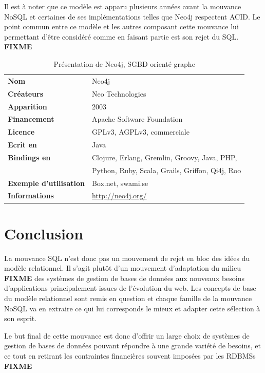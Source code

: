 \documentclass[11pt]{article}
\begin{document}
Il est à noter que ce modèle est apparu plusieurs années avant la mouvance NoSQL et certaines de ses implémentations telles que Neo4j respectent ACID. Le point commun entre ce modèle et les autres composant cette mouvance lui permettant d'être considéré comme en faisant partie est son rejet du SQL. \colorbox{BrickRed}{\textbf{FIXME}} 
\begin{table}[H]
  \centering
  \begin{tabular}{l | l}
    \textbf{Nom} & Neo4j \\
    \textbf{Créateurs} & Neo Technologies \\
    \textbf{Apparition} & 2003 \\
    \textbf{Financement} & Apache Software Foundation \\
    \textbf{Licence} & GPLv3, AGPLv3, commerciale \\
    \textbf{Ecrit en} & Java \\
    \textbf{Bindings en} & Clojure, Erlang, Gremlin, Groovy, Java, PHP,  \\
    & Python, Ruby, Scala, Grails, Griffon, Qi4j, Roo\\
    \textbf{Exemple d'utilisation} & Box.net, swami.se \\
    \textbf{Informations} & \url{http://neo4j.org/}
  \end{tabular}
  \caption{Présentation de Neo4j, SGBD orienté graphe}
\end{table}
\section{Conclusion}
La mouvance SQL n'est donc pas un mouvement de rejet en bloc des idées du modèle relationnel. Il s'agit plutôt d'un mouvement d'adaptation du milieu \colorbox{BrickRed}{\textbf{FIXME}} des systèmes de gestion de bases de données aux nouveaux besoins d'applications principalement issues de l'évolution du web. Les concepts de base du modèle relationnel sont remis en question et chaque famille de la mouvance NoSQL va en extraire ce qui lui corresponds le mieux et adapter cette sélection à son esprit.

Le but final de cette mouvance est donc d'offrir un large choix de systèmes de gestion de bases de données pouvant répondre à une grande variété de besoins, et ce tout en retirant les contraintes financières souvent imposées par les RDBMSs \colorbox{BrickRed}{\textbf{FIXME}} 
\end{document}
